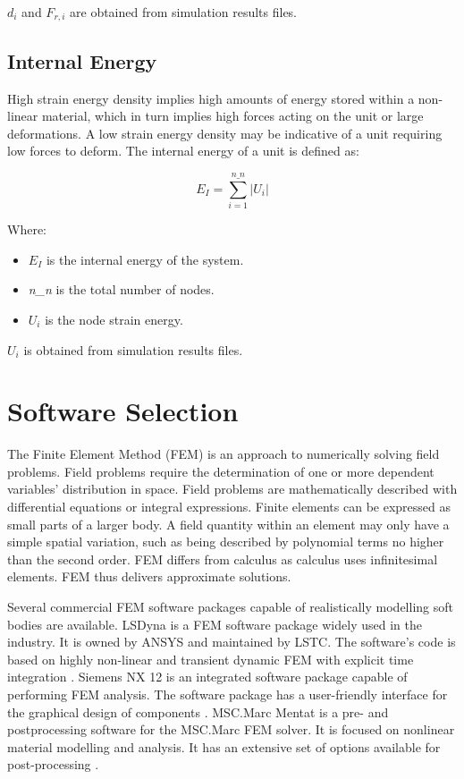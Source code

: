 $d_{i}$ and $F_{r,i}$ are obtained from simulation results files.

\subsection{Internal Energy}

High strain energy density implies high amounts of energy stored within a non-linear material, which in turn implies high forces acting on the unit or large deformations. A low strain energy density may be indicative of a unit requiring low forces to deform. The internal energy of a unit is defined as:

\begin{equation}
	E_{I}=\sum_{i=1}^{n\_n}\left | U_{i} \right |
\end{equation}

Where:

\begin{itemize}
	\item $E_{I}$ is the internal energy of the system.
	\item \textit{n\_n} is the total number of nodes.
	\item $U_{i}$ is the node strain energy.
\end{itemize}

$U_{i}$ is obtained from simulation results files.

\section{Software Selection}

The Finite Element Method (FEM) is an approach to numerically solving field problems. Field problems require the determination of one or more dependent variables' distribution in space. Field problems are mathematically described with differential equations or integral expressions. Finite elements can be expressed as small parts of a larger body. A field quantity within an element may only have a simple spatial variation, such as being described by polynomial terms no higher than the second order. FEM differs from calculus as calculus uses infinitesimal elements. FEM thus delivers approximate solutions. \citep{Cook2002}

Several commercial FEM software packages capable of realistically modelling soft bodies are available. LSDyna is a FEM software package widely used in the industry. It is owned by ANSYS and maintained by LSTC. The software's code is based on highly non-linear and transient dynamic FEM with explicit time integration \citep{LSDyna}. Siemens NX 12 is an integrated software package capable of performing FEM analysis. The software package has a user-friendly interface for the graphical design of components \citep{NX12}. MSC.Marc Mentat is a pre- and postprocessing software for the MSC.Marc FEM solver. It is focused on nonlinear material modelling and analysis. It has an extensive set of options available for post-processing \citep{MSC}.

